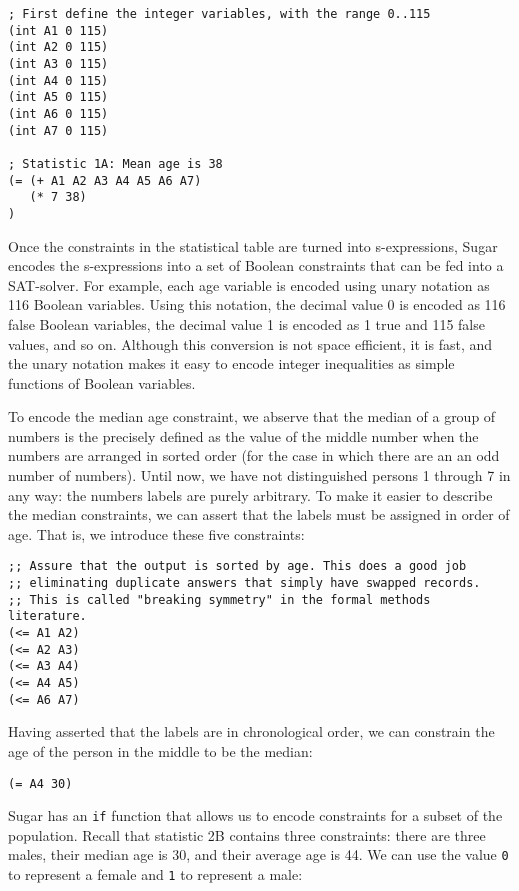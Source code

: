 \documentclass[runningheads]{llncs}
\begin{document}
\begin{Verbatim}
; First define the integer variables, with the range 0..115
(int A1 0 115)
(int A2 0 115)
(int A3 0 115)
(int A4 0 115)
(int A5 0 115)
(int A6 0 115)
(int A7 0 115)

; Statistic 1A: Mean age is 38
(= (+ A1 A2 A3 A4 A5 A6 A7)
   (* 7 38)
)
\end{Verbatim}
Once the constraints in the statistical table are turned into
s-expressions, Sugar encodes the s-expressions into a
set of Boolean constraints that can be fed into a SAT-solver. For example, each age variable
is encoded using unary notation as 116 Boolean variables. Using this
notation, the decimal value 0 is encoded as 116 false Boolean
variables, the decimal value 1 is encoded as 1 true and 115 false
values, and so on. Although this
conversion is not space efficient, it is fast, and the unary notation makes
it easy to encode integer inequalities as simple functions of Boolean
variables. 

To encode the median age constraint, we abserve that the median of a group
of numbers is the precisely defined as the value of the middle
number when the numbers are arranged in sorted order (for the case in
which there are an an odd number of numbers). Until now, we
have not distinguished persons 1 through 7 in any way: the numbers
labels are purely arbitrary. To make it easier to describe the median
constraints, we can assert that the labels must be assigned in order
of age. That is, we introduce these five constraints:

\begin{Verbatim}
;; Assure that the output is sorted by age. This does a good job 
;; eliminating duplicate answers that simply have swapped records.
;; This is called "breaking symmetry" in the formal methods literature. 
(<= A1 A2)
(<= A2 A3)
(<= A3 A4)
(<= A4 A5)
(<= A6 A7)
\end{Verbatim}

Having asserted that the labels are in chronological order, we can
constrain the age of the person in the middle to be the median:

\begin{Verbatim}
(= A4 30)
\end{Verbatim}

Sugar has an \texttt{if} function that allows us to encode constraints
for a subset of the population. Recall that statistic 2B contains three
constraints: there are three males, their median age is 30, and their
average age is 44. We can use the value \texttt{0} to represent a female
and \texttt{1} to represent a male:
\end{document}
